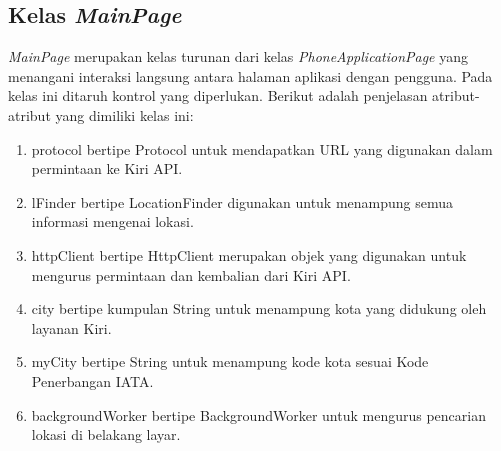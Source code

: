 \subsection{Kelas \textit{MainPage}}
\label{lab:Kelas MainPage}
\hspace{0.5cm} \textit{MainPage} merupakan kelas turunan dari kelas \textit{PhoneApplicationPage} yang menangani interaksi langsung antara halaman aplikasi dengan pengguna. Pada kelas ini ditaruh kontrol yang diperlukan. Berikut adalah penjelasan atribut-atribut yang dimiliki kelas ini:
\begin{enumerate}
	\item protocol bertipe Protocol untuk mendapatkan URL yang digunakan dalam permintaan ke Kiri API.
	\item lFinder bertipe LocationFinder digunakan untuk menampung semua informasi mengenai lokasi.
	\item httpClient bertipe HttpClient merupakan objek yang digunakan untuk mengurus permintaan dan kembalian dari Kiri API.
	\item city bertipe kumpulan String untuk menampung kota yang didukung oleh layanan Kiri.
	\item myCity bertipe String untuk menampung kode kota sesuai Kode Penerbangan IATA.
	\item backgroundWorker bertipe BackgroundWorker untuk mengurus pencarian lokasi di belakang layar.
\end{enumerate}

